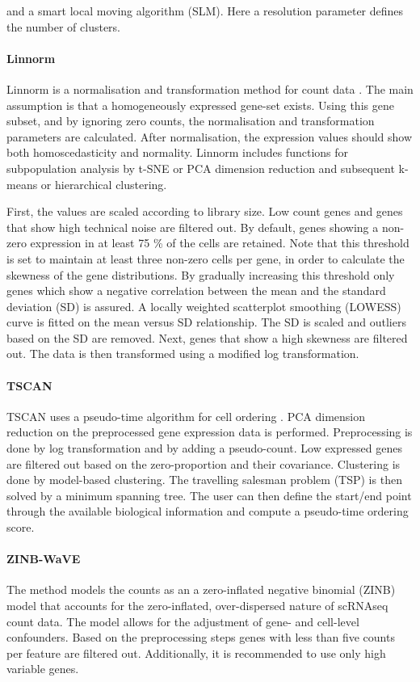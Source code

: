 \documentclass[11pt, a4paper]{article}\usepackage[]{graphicx}\usepackage[]{color}
\begin{document}
and a smart local moving algorithm (SLM). Here a resolution parameter defines the number of clusters.
\paragraph{Linnorm }
Linnorm is a normalisation and transformation method for count data \citep{yip2017linnorm}. The main assumption is that a homogeneously expressed gene-set exists. Using this gene subset, and by ignoring zero counts, the normalisation and transformation parameters are calculated. After normalisation, the expression values should show both homoscedasticity and normality. Linnorm includes functions for subpopulation analysis by t-SNE or PCA dimension reduction and subsequent k-means or hierarchical clustering. 

First, the values are scaled according to library size. Low count genes and genes that show high technical noise are filtered out. By default, genes showing a non-zero expression in at least 75 \% of the cells are retained. Note that this threshold is set to maintain at least three non-zero cells per gene, in order to calculate the skewness of the gene distributions. By gradually increasing this threshold only genes which show a negative correlation between the mean and the standard deviation (SD) is assured. 
A locally weighted scatterplot smoothing (LOWESS) curve is fitted on the mean versus SD relationship. The SD is scaled and outliers based on the SD are removed. Next, genes that show a high skewness are filtered out. The data is then transformed using a modified log transformation.
\paragraph{TSCAN}
TSCAN uses a pseudo-time algorithm for cell ordering \citep{ji2015tscan}. PCA dimension reduction on the preprocessed gene expression data is performed. Preprocessing is done by log transformation and by adding a pseudo-count. Low expressed genes are filtered out based on the zero-proportion and their covariance. Clustering is done by model-based clustering. 
The travelling salesman problem (TSP) is then solved by a minimum spanning tree. The user can then define the start/end point through the available biological information and compute a pseudo-time ordering score. 
\paragraph{ZINB-WaVE}
The method models the counts as an a zero-inflated negative binomial (ZINB) model that accounts for the zero-inflated, over-dispersed nature of scRNAseq count data\citep{risso2017zinb}. The model allows for the adjustment of gene- and cell-level confounders. 
Based on the preprocessing steps genes with less than five counts per feature are filtered out. Additionally, it is recommended to use only high variable genes.
\newpage
\end{document}
